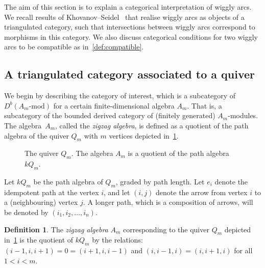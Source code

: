 \documentclass{amsart}
\theoremstyle{definition}
\newtheorem{definition}[theorem]{Definition}
\newcommand{\darkblue}{\color{darkblue}} %
\newcommand{\defn}[1]{\textsl{\darkblue #1}} %
\begin{document}
The aim of this section is to explain a categorical interpretation of wiggly arcs.
We recall results of Khovanov--Seidel~\cite{kho.sei:02} that realise wiggly arcs as objects of a triangulated category, such that intersections between wiggly arcs correspond to morphisms in this category.
We also discuss categorical conditions for two wiggly arcs to be compatible as in~\cref{def:compatible}.



\subsection{A triangulated category associated to a quiver}

We begin by describing the category of interest, which is a subcategory of \(D^b(A_m\text{-mod})\) for a certain finite-dimensional algebra \(A_m\).
That is, a subcategory of the bounded derived category of (finitely generated) \(A_m\)-modules.
The algebra~\(A_m\), called the \defn{zigzag algebra}, is defined as a quotient of the path algebra of the quiver \(Q_m\) with \(m\) vertices depicted in~\cref{fig:am-quiver}.
\begin{figure}[h]
  \centering
  \caption{The quiver \(Q_m\). The algebra \(A_m\) is a quotient of the path algebra \(kQ_m\).}
  \label{fig:am-quiver}
\end{figure}
Let \(kQ_m\) be the path algebra of \(Q_m\), graded by path length.
Let \(e_i\) denote the idempotent path at the vertex \(i\), and let \((i, j)\) denote the arrow from vertex \(i\) to a (neighbouring) vertex \(j\).
A longer path, which is a composition of arrows, will be denoted by \((i_1, i_2, \dots, i_n)\).

\begin{definition}
  The \defn{zigzag algebra} \(A_m\) corresponding to the quiver \(Q_m\) depicted in~\cref{fig:am-quiver} is the quotient of \(kQ_m\) by the relations: \((i-1, i, i+1) = 0 = (i+1, i, i-1)\) and \((i, i-1, i) = (i, i+1, i)\) for all~\(1 < i < m\).
\end{definition}
\end{document}
